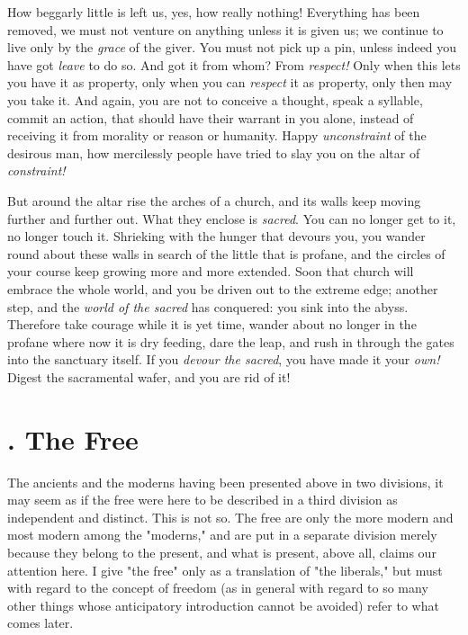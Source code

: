 How beggarly little is left us, yes, how really nothing! Everything has been 
removed, we must not venture on anything unless it is given us; we continue to 
live only by the \textit{grace} of the giver. You must not pick up a pin, 
unless indeed you have got \textit{leave} to do so. And got it from whom? From 
\textit{respect!} Only when this lets you have it as property, only when you 
can \textit{respect} it as property, only then may you take it. And again, you 
are not to conceive a thought, speak a syllable, commit an action, that should 
have their warrant in you alone, instead of receiving it from morality or 
reason or humanity. Happy \textit{unconstraint} of the desirous man, how 
mercilessly people have tried to slay you on the altar of \textit{constraint!}

But around the altar rise the arches of a church, and its walls keep moving 
further and further out. What they enclose is \textit{sacred}. You can no 
longer get to it, no longer touch it. Shrieking with the hunger that devours 
you, you wander round about these walls in search of the little that is 
profane, and the circles of your course keep growing more and more extended. 
Soon that church will embrace the whole world, and you be driven out to the 
extreme edge; another step, and the \textit{world of the sacred} has 
conquered: you sink into the abyss. Therefore take courage while it is yet 
time, wander about no longer in the profane where now it is dry feeding, dare 
the leap, and rush in through the gates into the sanctuary itself. If you 
\textit{devour the sacred}, you have made it your \textit{own!} Digest the 
sacramental wafer, and you are rid of it!

\section[3. The Free]{. The Free}

The ancients and the moderns having been presented above in two divisions, it 
may seem as if the free were here to be described in a third division as 
independent and distinct. This is not so. The free are only the more modern 
and most modern among the "{}moderns,"{} and are put in a separate division 
merely because they belong to the present, and what is present, above all, 
claims our attention here. I give "{}the free"{} only as a translation of 
"{}the liberals,"{} but must with regard to the concept of freedom (as in 
general with regard to so many other things whose anticipatory introduction 
cannot be avoided) refer to what comes later.

